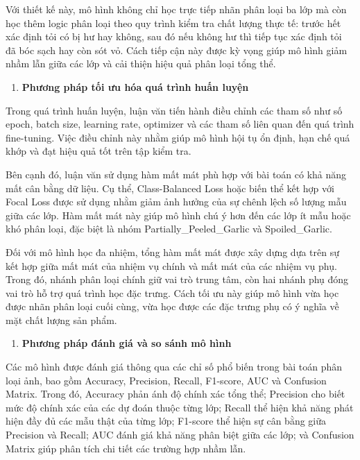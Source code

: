 \documentclass[
]{article}
\begin{document}
Với thiết kế này, mô hình không chỉ học trực tiếp nhãn phân loại ba lớp
mà còn học thêm logic phân loại theo quy trình kiểm tra chất lượng thực
tế: trước hết xác định tỏi có bị hư hay không, sau đó nếu không hư thì
tiếp tục xác định tỏi đã bóc sạch hay còn sót vỏ. Cách tiếp cận này được
kỳ vọng giúp mô hình giảm nhầm lẫn giữa các lớp và cải thiện hiệu quả
phân loại tổng thể.

\begin{enumerate}
\def\labelenumi{\alph{enumi}.}
\setcounter{enumi}{4}
\item
  \textbf{Phương pháp tối ưu hóa quá trình huấn luyện}
\end{enumerate}

Trong quá trình huấn luyện, luận văn tiến hành điều chỉnh các tham số
như số epoch, batch size, learning rate, optimizer và các tham số liên
quan đến quá trình fine-tuning. Việc điều chỉnh này nhằm giúp mô hình
hội tụ ổn định, hạn chế quá khớp và đạt hiệu quả tốt trên tập kiểm tra.

Bên cạnh đó, luận văn sử dụng hàm mất mát phù hợp với bài toán có khả
năng mất cân bằng dữ liệu. Cụ thể, Class-Balanced Loss hoặc biến thể kết
hợp với Focal Loss được sử dụng nhằm giảm ảnh hưởng của sự chênh lệch số
lượng mẫu giữa các lớp. Hàm mất mát này giúp mô hình chú ý hơn đến các
lớp ít mẫu hoặc khó phân loại, đặc biệt là nhóm
Partially\_Peeled\_Garlic và Spoiled\_Garlic.

Đối với mô hình học đa nhiệm, tổng hàm mất mát được xây dựng dựa trên sự
kết hợp giữa mất mát của nhiệm vụ chính và mất mát của các nhiệm vụ phụ.
Trong đó, nhánh phân loại chính giữ vai trò trung tâm, còn hai nhánh phụ
đóng vai trò hỗ trợ quá trình học đặc trưng. Cách tối ưu này giúp mô
hình vừa học được nhãn phân loại cuối cùng, vừa học được các đặc trưng
phụ có ý nghĩa về mặt chất lượng sản phẩm.

\begin{enumerate}
\def\labelenumi{\alph{enumi}.}
\setcounter{enumi}{5}
\item
  \textbf{Phương pháp đánh giá và so sánh mô hình}
\end{enumerate}

Các mô hình được đánh giá thông qua các chỉ số phổ biến trong bài toán
phân loại ảnh, bao gồm Accuracy, Precision, Recall, F1-score, AUC và
Confusion Matrix. Trong đó, Accuracy phản ánh độ chính xác tổng thể;
Precision cho biết mức độ chính xác của các dự đoán thuộc từng lớp;
Recall thể hiện khả năng phát hiện đầy đủ các mẫu thật của từng lớp;
F1-score thể hiện sự cân bằng giữa Precision và Recall; AUC đánh giá khả
năng phân biệt giữa các lớp; và Confusion Matrix giúp phân tích chi tiết
các trường hợp nhầm lẫn.
\end{document}
